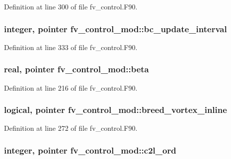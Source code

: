 Definition at line 300 of file fv\-\_\-control.\-F90.

\subsubsection[{bc\-\_\-update\-\_\-interval}]{\setlength{\rightskip}{0pt plus 5cm}integer, pointer fv\-\_\-control\-\_\-mod\-::bc\-\_\-update\-\_\-interval\hspace{0.3cm}{\ttfamily [private]}}\label{classfv__control__mod_a0b129755b56cb9d70a929b5d46ea0384}


Definition at line 333 of file fv\-\_\-control.\-F90.

\subsubsection[{beta}]{\setlength{\rightskip}{0pt plus 5cm}real, pointer fv\-\_\-control\-\_\-mod\-::beta\hspace{0.3cm}{\ttfamily [private]}}\label{classfv__control__mod_a5d1a537c7dbc2feea09ca52d1c0f3a1a}


Definition at line 216 of file fv\-\_\-control.\-F90.

\subsubsection[{breed\-\_\-vortex\-\_\-inline}]{\setlength{\rightskip}{0pt plus 5cm}logical, pointer fv\-\_\-control\-\_\-mod\-::breed\-\_\-vortex\-\_\-inline\hspace{0.3cm}{\ttfamily [private]}}\label{classfv__control__mod_a693fa8e76b528190da7bbc9a93a4f052}


Definition at line 272 of file fv\-\_\-control.\-F90.

\subsubsection[{c2l\-\_\-ord}]{\setlength{\rightskip}{0pt plus 5cm}integer, pointer fv\-\_\-control\-\_\-mod\-::c2l\-\_\-ord\hspace{0.3cm}{\ttfamily [private]}}\label{classfv__control__mod_ad022d95cf215a34772cae65cb436cf82}


